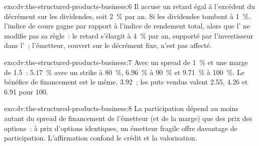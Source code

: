 \begin{solution}{exo:dv:the-structured-products-business:6}
Il accuse un retard égal à l'excédent du décrément sur les dividendes, soit 2~\% par an. Si les dividendes tombent à 1~\%, l'indice de cours gagne par rapport
à l'indice de rendement total, alors que l' ne modifie pas sa règle~: le retard s'élargit à 4~\% par an, supporté par l'investisseur dans l'~;
l'émetteur, couvert sur le décrément fixe, n'est pas affecté.
\end{solution}

\begin{solution}{exo:dv:the-structured-products-business:7}
Avec un spread de 1~\% et une marge de 1.5~: 5.17~\% avec un strike à 80~\%, 6.96~\% à 90~\% et 9.71~\% à 100~\%. Le bénéfice de financement est le même, 3.92~;
les puts vendus valent 2.55, 4.26 et 6.91 pour 100.
\end{solution}

\begin{solution}{exo:dv:the-structured-products-business:8}
La participation dépend au moins autant du spread de financement de l'émetteur (et de la marge) que des prix des options~: à prix d'options identiques, un émetteur fragile
offre davantage de participation. L'affirmation confond le crédit et la valorisation.
\end{solution}

